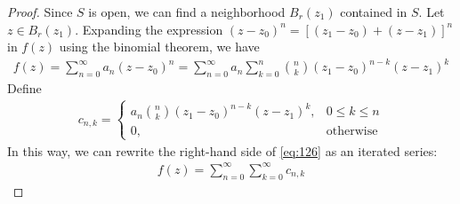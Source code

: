 \documentclass[thmcnt=section, 12pt]{my-elegantbook}
\begin{document}
\begin{proof}
    Since $S$ is open, we can find a neighborhood $B_r(z_1)$ contained in $S$. Let $z \in B_r(z_1)$. Expanding the expression $(z-z_0)^n = [(z_1 - z_0) + (z  - z_1)]^n$ in $f(z)$ using the binomial theorem, we have
    \begin{align}
        f(z) = \sum_{n=0}^\infty a_n (z - z_0)^n
        = \sum_{n=0}^\infty a_n \sum_{k=0}^n \binom{n}{k} (z_1 - z_0)^{n-k} (z - z_1)^k
        \label{eq:126}
    \end{align}
    Define
    \begin{align*}
        c_{n,k} = \begin{cases}
                      a_n \binom{n}{k} (z_1 - z_0)^{n-k} (z - z_1)^k,
                       & 0 \leq k \leq n  \\
                      0,
                       & \text{otherwise}
                  \end{cases}
    \end{align*}
    In this way, we can rewrite the right-hand side of \eqref{eq:126} as an iterated series:
    \begin{align}
        f(z) = \sum_{n=0}^\infty \sum_{k=0}^\infty c_{n,k}
        \label{eq:127}
    \end{align}


\end{proof}
\end{document}
